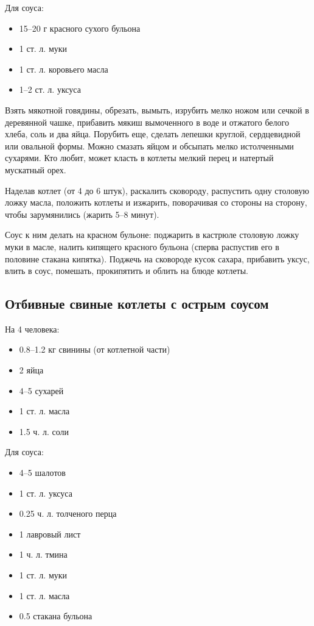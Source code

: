 Для соуса: 

\begin{itemize} 
	\item 15–20 г красного сухого бульона
    \item 1 ст. л. муки 
    \item 1 ст. л. коровьего масла 
    \item 1–2 ст. л. уксуса
\end{itemize}

Взять мякотной говядины, обрезать, вымыть, изрубить мелко ножом или сечкой в деревянной чашке, прибавить мякиш вымоченного в воде и отжатого белого хлеба, соль и два яйца. Порубить еще, сделать лепешки круглой, сердцевидной или овальной формы. Можно смазать яйцом и обсыпать мелко истолченными сухарями. Кто любит, может класть в котлеты мелкий перец и натертый мускатный орех.

Наделав котлет (от 4 до 6 штук), раскалить сковороду, распустить одну столовую ложку масла, положить котлеты и изжарить, поворачивая со стороны на сторону, чтобы зарумянились (жарить 5–8 минут).

Соус к ним делать на красном бульоне: поджарить в кастрюле столовую ложку муки в масле, налить кипящего красного бульона (сперва распустив его в половине стакана кипятка). Поджечь на сковороде кусок сахара, прибавить уксус, влить в соус, помешать, прокипятить и облить на блюде котлеты.

\subsection{Отбивные свиные котлеты с острым соусом}

На 4 человека:

\begin{itemize} 
	\item  0.8–1.2 кг свинины (от котлетной части) 
    \item 2 яйца 
    \item 4–5 сухарей 
    \item 1 ст. л. масла
    \item 1.5 ч. л. соли 
\end{itemize}

Для соуса:

\begin{itemize} 	
	\item  4–5 шалотов 
	\item 1 ст. л. уксуса 
    \item 0.25 ч. л. толченого перца 
    \item 1 лавровый лист 
    \item 1 ч. л. тмина 
    \item 1 ст. л. муки 
    \item 1 ст. л. масла 
    \item 0.5 стакана бульона
\end{itemize}

